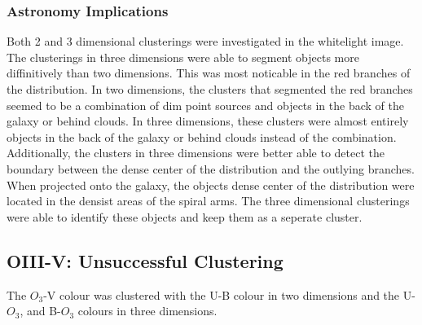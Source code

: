 \subsubsection{Astronomy Implications}
Both 2 and 3 dimensional clusterings were investigated in the whitelight image. 
The clusterings in three dimensions were able to segment objects more diffinitively than two dimensions.
This was most noticable in the red branches of the distribution.
In two dimensions, the clusters that segmented the red branches seemed to be a combination of dim point sources and objects in the back of the galaxy or behind clouds.
In three dimensions, these clusters were almost entirely objects in the back of the galaxy or behind clouds instead of the combination.
Additionally, the clusters in three dimensions were better able to detect the boundary between the dense center of the distribution and the outlying branches.
When projected onto the galaxy, the objects dense center of the distribution were located in the densist areas of the spiral arms.
The three dimensional clusterings were able to identify these objects and keep them as a seperate cluster.

\subsection{OIII-V: Unsuccessful Clustering}
The $O_{3}$-V colour was clustered with the U-B colour in two dimensions and the U-$O_{3}$, and B-$O_{3}$ colours in three dimensions.

